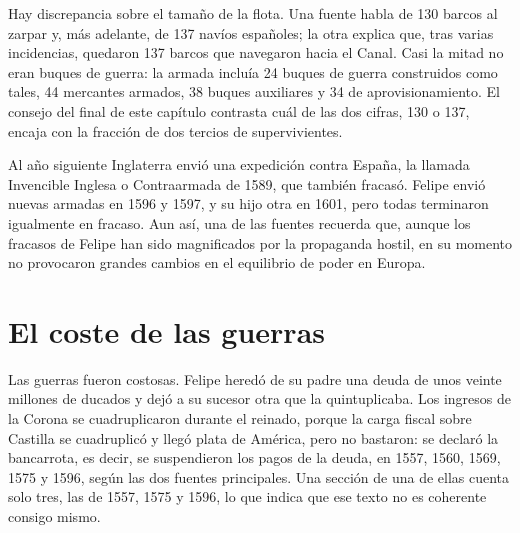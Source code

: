 \documentclass{book}
\begin{document}

Hay discrepancia sobre el tamaño de la flota. Una fuente habla de 130 barcos al zarpar y, más adelante, de 137 navíos españoles; la otra explica que, tras varias incidencias, quedaron 137 barcos que navegaron hacia el Canal. Casi la mitad no eran buques de guerra: la armada incluía 24 buques de guerra construidos como tales, 44 mercantes armados, 38 buques auxiliares y 34 de aprovisionamiento. El consejo del final de este capítulo contrasta cuál de las dos cifras, 130 o 137, encaja con la fracción de dos tercios de supervivientes.


Al año siguiente Inglaterra envió una expedición contra España, la llamada Invencible Inglesa o Contraarmada de 1589, que también fracasó. Felipe envió nuevas armadas en 1596 y 1597, y su hijo otra en 1601, pero todas terminaron igualmente en fracaso. Aun así, una de las fuentes recuerda que, aunque los fracasos de Felipe han sido magnificados por la propaganda hostil, en su momento no provocaron grandes cambios en el equilibrio de poder en Europa.


\section{El coste de las guerras}

Las guerras fueron costosas. Felipe heredó de su padre una deuda de unos veinte millones de ducados y dejó a su sucesor otra que la quintuplicaba. Los ingresos de la Corona se cuadruplicaron durante el reinado, porque la carga fiscal sobre Castilla se cuadruplicó y llegó plata de América, pero no bastaron: se declaró la bancarrota, es decir, se suspendieron los pagos de la deuda, en 1557, 1560, 1569, 1575 y 1596, según las dos fuentes principales. Una sección de una de ellas cuenta solo tres, las de 1557, 1575 y 1596, lo que indica que ese texto no es coherente consigo mismo.

\end{document}
